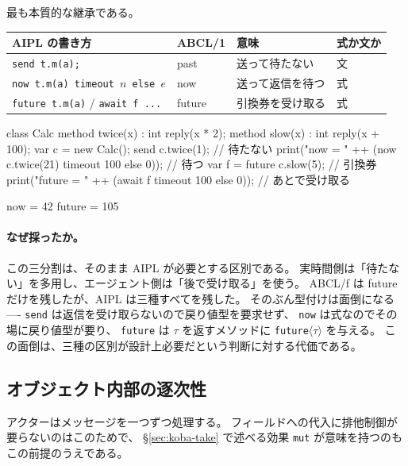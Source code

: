 \documentclass[11pt,a4paper]{ltjsarticle}
\theoremstyle{definition}
\theoremstyle{remark}
\begin{document}
最も本質的な継承である。

\begin{center}
\begin{tabular}{llll}
\toprule
AIPL の書き方 & ABCL/1 & 意味 & 式か文か \\
\midrule
\texttt{send t.m(a);}                          & past   & 送って待たない & 文 \\
\texttt{now t.m(a) timeout $n$ else $e$}       & now    & 送って返信を待つ & 式 \\
\texttt{future t.m(a)} / \texttt{await f ...}  & future & 引換券を受け取る & 式 \\
\bottomrule
\end{tabular}
\end{center}

\begin{aipl}
class Calc {
  method twice(x) : int { reply(x * 2); }
  method slow(x)  : int { reply(x + 100); }
}
var c = new Calc();
send c.twice(1);                                            // 待たない
print("now    = " ++ (now c.twice(21) timeout 100 else 0)); // 待つ
var f = future c.slow(5);                                   // 引換券
print("future = " ++ (await f timeout 100 else 0));         // あとで受け取る
\end{aipl}
\begin{term}
now    = 42
future = 105
\end{term}

\paragraph{なぜ採ったか。}
この三分割は、そのまま AIPL が必要とする区別である。
実時間側は「待たない」を多用し、エージェント側は「後で受け取る」を使う。
ABCL/f は future だけを残したが、AIPL は三種すべてを残した。
そのぶん型付けは面倒になる ---- \texttt{send} は返信を受け取らないので戻り値型を要求せず、
\texttt{now} は式なのでその場に戻り値型が要り、
\texttt{future} は $\tau$ を返すメソッドに \texttt{future}$\langle\tau\rangle$ を与える。
この面倒は、三種の区別が設計上必要だという判断に対する代価である。

\subsection{オブジェクト内部の逐次性}

アクターはメッセージを一つずつ処理する。
フィールドへの代入に排他制御が要らないのはこのためで、
\S\ref{sec:koba-take} で述べる効果 \texttt{mut} が意味を持つのもこの前提のうえである。
\end{document}
